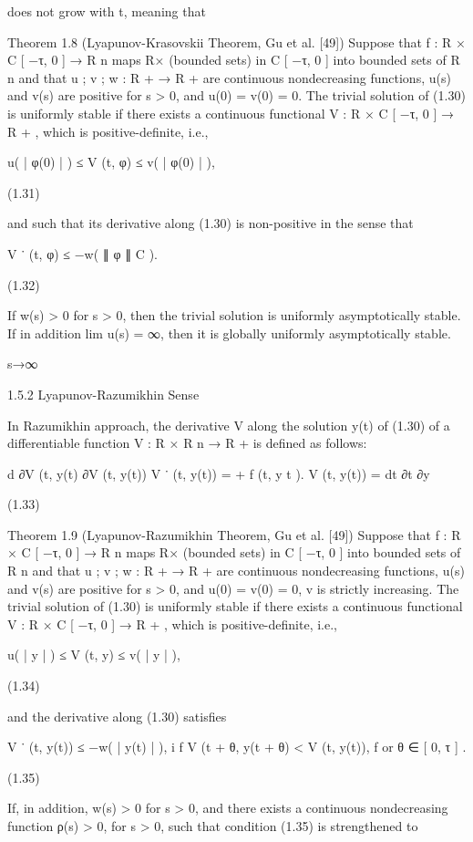 \documentclass[12pt]{article}
\begin{document}
does not grow with t, meaning that

Theorem 1.8 (Lyapunov-Krasovskii Theorem, Gu et al. [49]) Suppose that f : R × C [ −τ, 0 ] → R n maps R× (bounded sets) in C [ −τ, 0 ] 
into bounded sets of R n and that u ; v ; w : R + → R + are continuous nondecreasing functions, u(s) and v(s) are positive for s > 0, and 
u(0) = v(0) = 0. The trivial solution of (1.30) is uniformly stable if there exists a continuous functional V : R × C [ −τ, 0 ] → R + , 
which is positive-deﬁnite, i.e.,

u( | φ(0) | ) ≤ V (t, φ) ≤ v( | φ(0) | ),

(1.31)

and such that its derivative along (1.30) is non-positive in the sense that

V ˙ (t, φ) ≤ −w( ∥ φ ∥ C ).

(1.32)

If w(s) > 0 for s > 0, then the trivial solution is uniformly asymptotically stable. If in addition lim u(s) = ∞, then it is globally 
uniformly asymptotically stable.

s→∞

1.5.2 Lyapunov-Razumikhin Sense

In Razumikhin approach, the derivative V along the solution y(t) of (1.30) of a differentiable function V : R × R n → R + is deﬁned as 
follows:

d ∂V (t, y(t) ∂V (t, y(t)) V ˙ (t, y(t)) = + f (t, y t ). V (t, y(t)) = dt ∂t ∂y

(1.33)

Theorem 1.9 (Lyapunov-Razumikhin Theorem, Gu et al. [49]) Suppose that f : R × C [ −τ, 0 ] → R n maps R× (bounded sets) in C [ −τ, 0 ] 
into bounded sets of R n and that u ; v ; w : R + → R + are continuous nondecreasing functions, u(s) and v(s) are positive for s > 0, and 
u(0) = v(0) = 0, v is strictly increasing. The trivial solution of (1.30) is uniformly stable if there exists a continuous functional V : R × 
C [ −τ, 0 ] → R + , which is positive-deﬁnite, i.e.,

u( | y | ) ≤ V (t, y) ≤ v( | y | ),

(1.34)

and the derivative along (1.30) satisﬁes

V ˙ (t, y(t)) ≤ −w( | y(t) | ), i f V (t + θ, y(t + θ) < V (t, y(t)), f or θ ∈ [ 0, τ ] .

(1.35)

If, in addition, w(s) > 0 for s > 0, and there exists a continuous nondecreasing function ρ(s) > 0, for s > 0, such that condition (1.35) is 
strengthened to
\end{document}
